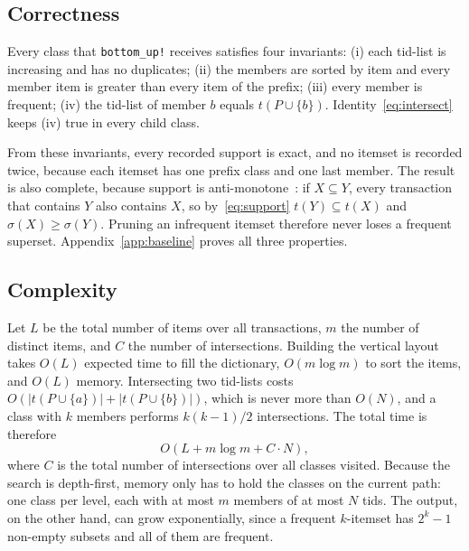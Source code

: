\subsection{Correctness}
\label{sec:correctness}
Every class that \texttt{bottom\_up!} receives satisfies four invariants: (i) each
tid-list is increasing and has no duplicates; (ii) the members are sorted by item and
every member item is greater than every item of the prefix; (iii) every member is
frequent; (iv) the tid-list of member $b$ equals $t(P \cup \{b\})$. Identity~\eqref{eq:intersect}
keeps (iv) true in every child class.

From these invariants, every recorded support is exact, and no itemset is recorded twice,
because each itemset has one prefix class and one last member. The result is also
complete, because support is anti-monotone~\cite{agrawal1994}: if $X \subseteq Y$, every
transaction that contains $Y$ also contains $X$, so by~\eqref{eq:support}
$t(Y) \subseteq t(X)$ and $\sigma(X) \ge \sigma(Y)$. Pruning an infrequent itemset
therefore never loses a frequent superset. Appendix~\ref{app:baseline} proves all three
properties.

\subsection{Complexity}
Let $L$ be the total number of items over all transactions, $m$ the number of distinct
items, and $C$ the number of intersections. Building the vertical layout takes $O(L)$
expected time to fill the dictionary, $O(m \log m)$ to sort the items, and $O(L)$ memory.
Intersecting two tid-lists costs $O(|t(P \cup \{a\})| + |t(P \cup \{b\})|)$, which is
never more than $O(N)$, and a class with $k$ members performs $k(k-1)/2$ intersections.
The total time is therefore
\begin{equation}
  O(L + m \log m + C \cdot N),
  \label{eq:cost}
\end{equation}
where $C$ is the total number of intersections over all classes visited. Because the
search is depth-first, memory only has to hold the classes on the current path: one class
per level, each with at most $m$ members of at most $N$ tids. The output, on the other
hand, can grow exponentially, since a frequent $k$-itemset has $2^k - 1$ non-empty
subsets and all of them are frequent.

